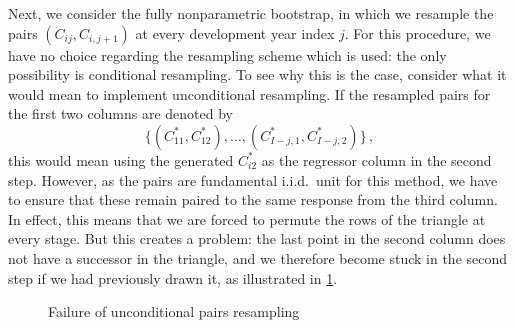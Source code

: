 \documentclass[a4paper]{book}
\begin{document}
Next, we consider the fully nonparametric bootstrap, in which we resample the pairs \linebreak
$(C_{ij}, C_{i, j + 1})$ at every development year index $j$. For this procedure, we have no choice regarding the resampling scheme which is used: the only possibility is conditional resampling. To see why this is the case, consider what it would mean to implement unconditional resampling. If the resampled pairs for the first two columns are denoted by
\begin{displaymath}
  \{ (C^*_{11}, C^*_{12}), \dots, (C^*_{I - j, 1}, C^*_{I - j, 2}) \} \,,
\end{displaymath}
this would mean using the generated $C^*_{i2}$ as the regressor column in the second step. However, as the pairs are fundamental i.i.d.\ unit for this method, we have to ensure that these remain paired to the same response from the third column. In effect, this means that we are forced to permute the rows of the triangle at every stage. But this creates a problem: the last point in the second column does not have a successor in the triangle, and we therefore become stuck in the second step if we had previously drawn it, as illustrated in \cref{fig:uncond-pairs-resample}.
\begin{figure}[!htb]
  \centering
  \caption{Failure of unconditional pairs resampling}
  \label{fig:uncond-pairs-resample}
\end{figure}
\end{document}

